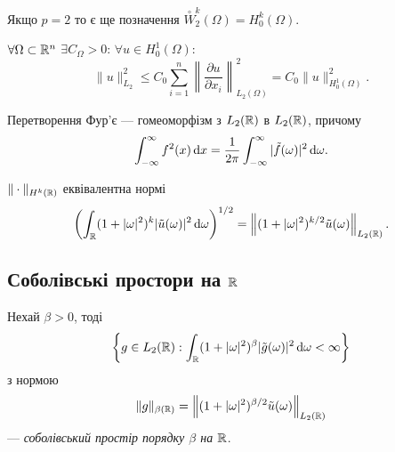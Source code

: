 
\begin{remark}
    Якщо $p = 2$ то є ще позначення $\overset{\circ}{W}_2^k(\Omega) = H_0^k(\Omega)$.
\end{remark}

\begin{proposition}
    $\forall \Omega \subset \mathbb{R}^n$ $\exists C_\Omega > 0$: $\forall u \in H_0^1 (\Omega)$:
    \begin{equation}
        \|u\|_{L_2}^2 \le C_0 \sum_{i = 1}^n \left\| \frac{\partial u}{\partial x_i} \right\|_{L_2(\Omega)}^2 = C_0 \|u\|^2_{H_0^1(\Omega)}.
    \end{equation}
\end{proposition}

\begin{proposition}
    Перетворення Фур'є --- гомеоморфізм з $L_2(\mathbb{R})$ в $L_2(\mathbb{R})$, причому
    \begin{equation}
        \int_{-\infty}^\infty f^2(x) \mathop{}\!\mathrm{d} x = \frac{1}{2 \pi} \int_{-\infty}^\infty |\tilde{f}(\omega)|^2 \mathop{}\!\mathrm{d} \omega.
    \end{equation}
\end{proposition}

\begin{proposition}
    $\|\cdot\|_{H^k(\mathbb{R})}$ еквівалентна нормі
    \begin{equation}
        \left( \int_{\mathbb{R}} (1 + |\omega|^2)^k |\tilde{u}(\omega)|^2 \mathop{}\!\mathrm{d} \omega \right)^{1/2}
        = \left\|(1 + |\omega|^2)^{k/2} \tilde{u}(\omega)\right\|_{L_2(\mathbb{R})}.
    \end{equation}
\end{proposition}

\subsection{Соболівські простори на $\mathbb{R}$}

\begin{definition}
    Нехай $\beta > 0$, тоді
    \begin{equation}
        \left\{g \in L_2(\mathbb{R}): \int_{\mathbb{R}} (1 + |\omega|^2)^\beta |\tilde{g}(\omega)|^2 \mathop{}\!\mathrm{d} \omega < \infty \right\}
    \end{equation}
    з нормою
    \begin{equation}
        \|g\|_{\beta(\mathbb{R})} = \left\|(1 + |\omega|^2)^{\beta/2} \tilde{u}(\omega)\right\|_{L_2(\mathbb{R})}
    \end{equation}
    --- \textit{соболівський простір порядку $\beta$ на $\mathbb{R}$}.
\end{definition}

